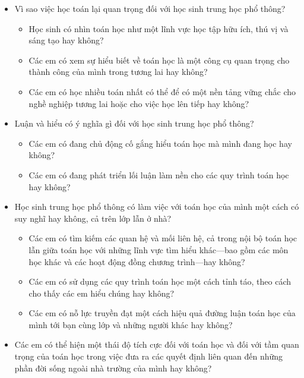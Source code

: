 \documentclass[
  10pt,
  a4paper,
  landscape,
  twoside,
  openany
]{scrbook}
\newcommand{\EN}[1]{#1}
\begin{document}
{
\EN{
  \begin{itemize}
    \item Vì sao việc học toán lại quan trọng đối với học sinh trung học phổ thông?
      \begin{itemize}
        \item Học sinh có nhìn toán học như một lĩnh vực học tập hữu ích, thú vị và sáng tạo hay không?
        \item Các em có xem sự hiểu biết về toán học là một công cụ quan trọng cho thành công của mình trong tương lai hay không?
        \item Các em có học nhiều toán nhất có thể để có một nền tảng vững chắc cho nghề nghiệp tương lai hoặc cho việc học lên tiếp hay không?
      \end{itemize}
    \item Luận và hiểu có ý nghĩa gì đối với học sinh trung học phổ thông?
      \begin{itemize}
        \item Các em có đang chủ động cố gắng hiểu toán học mà mình đang học hay không?
        \item Các em có đang phát triển lối luận làm nền cho các quy trình toán học hay không?
      \end{itemize}
    \item Học sinh trung học phổ thông có làm việc với toán học của mình một cách có suy nghĩ hay không, cả trên lớp lẫn ở nhà?
      \begin{itemize}
        \item Các em có tìm kiếm các quan hệ và mối liên hệ, cả trong nội bộ toán học lẫn giữa toán học với những lĩnh vực tìm hiểu khác---bao gồm các môn học khác và các hoạt động đồng chương trình---hay không?
        \item Các em có sử dụng các quy trình toán học một cách tỉnh táo, theo cách cho thấy các em hiểu chúng hay không?
        \item Các em có nỗ lực truyền đạt một cách hiệu quả đường luận toán học của mình tới bạn cùng lớp và những người khác hay không?
      \end{itemize}
    \item Các em có thể hiện một thái độ tích cực đối với toán học và đối với tầm quan trọng của toán học trong việc đưa ra các quyết định liên quan đến những phần đời sống ngoài nhà trường của mình hay không?
  \end{itemize}}
}
\end{document}
